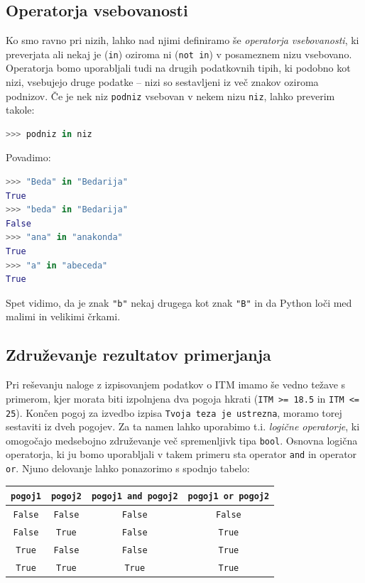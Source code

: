 \subsection{Operatorja vsebovanosti}

Ko smo ravno pri nizih, lahko nad njimi definiramo še \emph{operatorja vsebovanosti}, ki preverjata ali nekaj je (\texttt{in}) oziroma ni (\texttt{not in}) v posameznem nizu vsebovano. Operatorja bomo uporabljali tudi na drugih podatkovnih tipih, ki podobno kot nizi, vsebujejo druge podatke -- nizi so sestavljeni iz več znakov oziroma podnizov. Če je nek niz \texttt{podniz} vsebovan v nekem nizu \texttt{niz}, lahko preverim takole:
\begin{lstlisting}[language=Python]
>>> podniz in niz
\end{lstlisting}
Povadimo:
\begin{lstlisting}[language=Python]
>>> "Beda" in "Bedarija"
True
>>> "beda" in "Bedarija"
False
>>> "ana" in "anakonda"
True
>>> "a" in "abeceda"
True
\end{lstlisting}
Spet vidimo, da je znak \texttt{"b"} nekaj drugega kot znak \texttt{"B"} in da Python loči med malimi in velikimi črkami.

\subsection{Združevanje rezultatov primerjanja}

Pri reševanju naloge z izpisovanjem podatkov o ITM imamo še vedno težave s primerom, kjer morata biti izpolnjena dva pogoja hkrati (\texttt{ITM >= 18.5} in \texttt{ITM <= 25}). Končen pogoj za izvedbo izpisa \texttt{Tvoja teza je ustrezna}, moramo torej sestaviti iz dveh pogojev. Za ta namen lahko uporabimo t.i. \emph{logične operatorje}, ki omogočajo medsebojno združevanje več spremenljivk tipa \texttt{bool}. Osnovna logična operatorja, ki ju bomo uporabljali v takem primeru sta operator \texttt{and} in operator \texttt{or}. Njuno delovanje lahko ponazorimo s spodnjo tabelo:

\begin{tabular}{cc|cc}
     \texttt{pogoj1} & \texttt{pogoj2}  & \texttt{pogoj1 and pogoj2} & \texttt{pogoj1 or pogoj2}\\
     \hline
     \texttt{False} & \texttt{False} & \texttt{False} & \texttt{False} \\
     \texttt{False} & \texttt{True} & \texttt{False} & \texttt{True} \\
     \texttt{True} & \texttt{False} & \texttt{False} & \texttt{True} \\
     \texttt{True} & \texttt{True} & \texttt{True} & \texttt{True} \\
\end{tabular}

